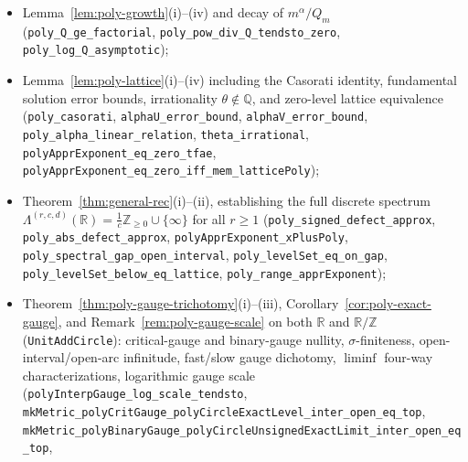 \documentclass[11pt]{article}
\theoremstyle{definition}
\theoremstyle{remark}
\newcommand{\R}{\mathbb{R}}
\newcommand{\Z}{\mathbb{Z}}
\newcommand{\Q}{\mathbb{Q}}
\newcommand{\Lam}{\Lambda}
\begin{document}
\begin{itemize}[leftmargin=1.8em]
\item Lemma~\ref{lem:poly-growth}(i)--(iv) and decay of $m^\alpha/Q_m$
(\texttt{poly\_\allowbreak Q\_\allowbreak ge\_\allowbreak factorial},
\texttt{poly\_\allowbreak pow\_\allowbreak div\_\allowbreak Q\_\allowbreak tendsto\_\allowbreak zero},
\texttt{poly\_\allowbreak log\_\allowbreak Q\_\allowbreak asymptotic});
\item Lemma~\ref{lem:poly-lattice}(i)--(iv) including the Casorati identity,
fundamental solution error bounds, irrationality $\theta\notin\Q$, and
zero-level lattice equivalence
(\texttt{poly\_\allowbreak casorati},
\texttt{alphaU\_\allowbreak error\_\allowbreak bound},
\texttt{alphaV\_\allowbreak error\_\allowbreak bound},
\texttt{poly\_\allowbreak alpha\_\allowbreak linear\_\allowbreak relation},
\texttt{theta\_\allowbreak irrational},
\texttt{polyApprExponent\_\allowbreak eq\_\allowbreak zero\_\allowbreak tfae},
\texttt{polyApprExponent\_\allowbreak eq\_\allowbreak zero\_\allowbreak iff\_\allowbreak mem\_\allowbreak latticePoly});
\item Theorem~\ref{thm:general-rec}(i)--(ii), establishing the full discrete
spectrum $\Lam^{(r,c,d)}(\R)=\frac{1}{c}\Z_{\ge0}\cup\{\infty\}$ for all
$r\ge1$
(\texttt{poly\_\allowbreak signed\_\allowbreak defect\_\allowbreak approx},
\texttt{poly\_\allowbreak abs\_\allowbreak defect\_\allowbreak approx},
\texttt{polyApprExponent\_\allowbreak xPlusPoly},
\texttt{poly\_\allowbreak spectral\_\allowbreak gap\_\allowbreak open\_\allowbreak interval},
\texttt{poly\_\allowbreak levelSet\_\allowbreak eq\_\allowbreak on\_\allowbreak gap},
\texttt{poly\_\allowbreak levelSet\_\allowbreak below\_\allowbreak eq\_\allowbreak lattice},
\texttt{poly\_\allowbreak range\_\allowbreak apprExponent});
\item Theorem~\ref{thm:poly-gauge-trichotomy}(i)--(iii),
Corollary~\ref{cor:poly-exact-gauge}, and Remark~\ref{rem:poly-gauge-scale} on
both $\R$ and $\R/\Z$ (\texttt{UnitAddCircle}): critical-gauge and
binary-gauge nullity, $\sigma$-finiteness, open-interval/open-arc infinitude,
fast/slow gauge dichotomy, $\liminf$ four-way characterizations, logarithmic
gauge scale (\texttt{polyInterpGauge\_\allowbreak log\_\allowbreak scale\_\allowbreak tendsto},
\texttt{mkMetric\_\allowbreak polyCritGauge\_\allowbreak polyCircleExactLevel\_\allowbreak inter\_\allowbreak open\_\allowbreak eq\_\allowbreak top},
\texttt{mkMetric\_\allowbreak polyBinaryGauge\_\allowbreak polyCircleUnsignedExactLimit\_\allowbreak inter\_\allowbreak open\_\allowbreak eq\_\allowbreak top},

\end{itemize}
\end{document}
